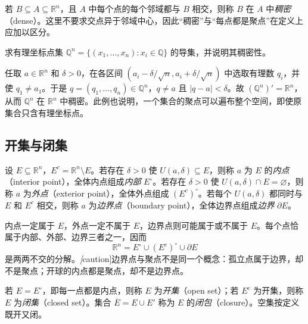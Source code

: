 若 $B\subseteq A\subseteq\mathbb R^n$，且 $A$ 中每个点的每个邻域都与 $B$ 相交，则称 $B$ 在 $A$ 中\emph{稠密}（dense）。这里不要求交点异于邻域中心，因此“稠密”与“每点都是聚点”在定义上应加以区分。

\begin{example}
\label{ex:rational-coordinate-points-dense}
求有理坐标点集 $\mathbb Q^n=\{(x_1,\ldots,x_n):x_i\in\mathbb Q\}$ 的导集，并说明其稠密性。
\end{example}

\begin{solve}
任取 $a\in\mathbb R^n$ 和 $\delta>0$，在各区间 $(a_i-\delta/\sqrt n,a_i+\delta/\sqrt n)$ 中选取有理数 $q_i$，并使 $q_1\neq a_1$。于是 $q=(q_1,\ldots,q_n)\in\mathbb Q^n$，$q\neq a$ 且 $|q-a|<\delta$。故 $(\mathbb Q^n)'=\mathbb R^n$，从而 $\mathbb Q^n$ 在 $\mathbb R^n$ 中稠密。此例也说明，一个集合的聚点可以遍布整个空间，即使原集合只含有理坐标点。
\end{solve}

\subsection{开集与闭集}
\label{subsec:open-and-closed-sets}

\begin{definition}
\label{def:euclidean-interior-exterior-boundary}
设 $E\subseteq\mathbb R^n$，$E^c=\mathbb R^n\setminus E$。若存在 $\delta>0$ 使 $U(a,\delta)\subseteq E$，则称 $a$ 为 $E$ 的\emph{内点}（interior point），全体内点组成\emph{内部} $E^\circ$。若存在 $\delta>0$ 使 $U(a,\delta)\cap E=\varnothing$，则称 $a$ 为\emph{外点}（exterior point），全体外点组成 $(E^c)^\circ$。若每个 $U(a,\delta)$ 都同时与 $E$ 和 $E^c$ 相交，则称 $a$ 为\emph{边界点}（boundary point），全体边界点组成\emph{边界} $\partial E$。
\end{definition}

内点一定属于 $E$，外点一定不属于 $E$，边界点则可能属于或不属于 $E$。每个点恰属于内部、外部、边界三者之一，因而
\[
    \mathbb R^n=E^\circ\cup(E^c)^\circ\cup\partial E
\]
是两两不交的分解。\emph[caution]{边界点与聚点不是同一个概念}：孤立点属于边界，却不是聚点；开球的内点都是聚点，却不是边界点。

\begin{definition}
\label{def:euclidean-open-closed-closure}
若 $E=E^\circ$，即每一点都是内点，则称 $E$ 为\emph{开集}（open set）；若 $E^c$ 为开集，则称 $E$ 为\emph{闭集}（closed set）。集合 $\overline E=E\cup E'$ 称为 $E$ 的\emph{闭包}（closure）。空集按定义既开又闭。
\end{definition}

